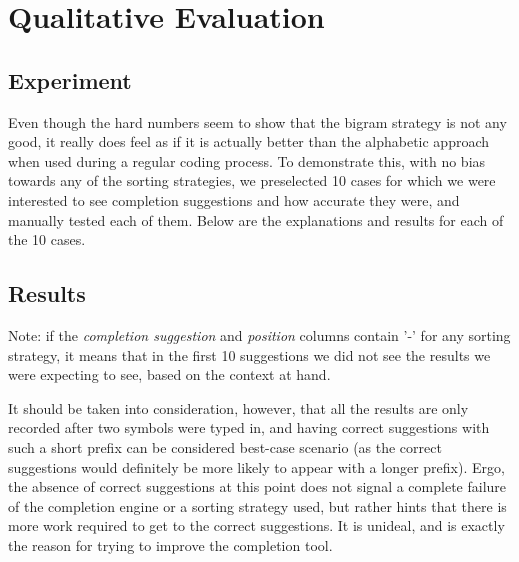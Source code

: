 \section{Qualitative Evaluation}
\label{sec:Evaluation-Qualitative}
\subsection{Experiment}
Even though the hard numbers seem to show that the bigram strategy is not any good, it really does feel as if it is actually better than the alphabetic approach when used during a regular coding process. To demonstrate this, with no bias towards any of the sorting strategies, we preselected 10 cases for which we were interested to see completion suggestions and how accurate they were, and manually tested each of them. Below are the explanations and results for each of the 10 cases.

\subsection{Results}
Note: if the \textit{completion suggestion} and \textit{position} columns contain '-' for any sorting strategy, it means that in the first 10 suggestions we did not see the results we were expecting to see, based on the context at hand.

It should be taken into consideration, however, that all the results are only recorded after two symbols were typed in, and having correct suggestions with such a short prefix can be considered best-case scenario (as the correct suggestions would definitely be more likely to appear with a longer prefix). Ergo, the absence of correct suggestions at this point does not signal a complete failure of the completion engine or a sorting strategy used, but rather hints that there is more work required to get to the correct suggestions. It is unideal, and is exactly the reason for trying to improve the completion tool.

